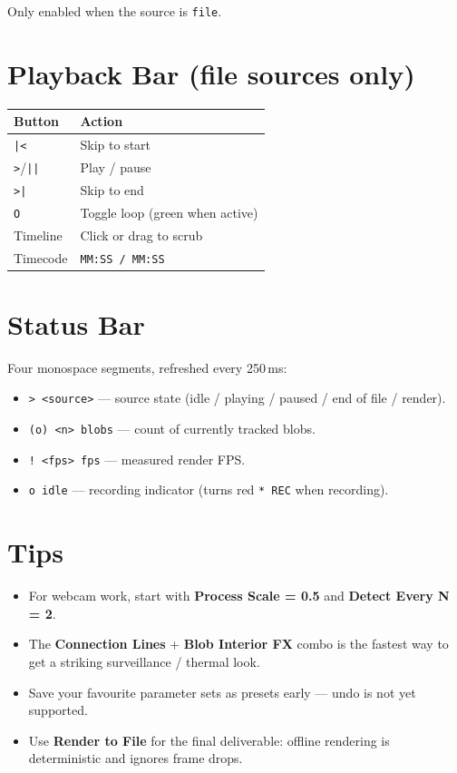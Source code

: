 \documentclass[11pt,a4paper,openany]{report}
\begin{document}
\begin{btnote}
Only enabled when the source is \texttt{file}.
\end{btnote}

\section{Playback Bar (file sources only)}

\begin{tabularx}{\linewidth}{@{}lX@{}}
    \toprule
    \textbf{Button} & \textbf{Action} \\
    \midrule
    \texttt{|<}  & Skip to start \\
    \texttt{>}/\texttt{||} & Play / pause \\
    \texttt{>|}  & Skip to end \\
    \texttt{O}   & Toggle loop (green when active) \\
    Timeline    & Click or drag to scrub \\
    Timecode    & \texttt{MM:SS / MM:SS} \\
    \bottomrule
\end{tabularx}

\section{Status Bar}

Four monospace segments, refreshed every 250\,ms:

\begin{itemize}
    \item \texttt{> <source>} --- source state (idle / playing / paused /
        end of file / render).
    \item \texttt{(o) <n> blobs} --- count of currently tracked blobs.
    \item \texttt{! <fps> fps} --- measured render FPS.
    \item \texttt{o idle} --- recording indicator (turns red \texttt{* REC}
        when recording).
\end{itemize}

\section{Tips}

\begin{itemize}
    \item For webcam work, start with \textbf{Process Scale = 0.5} and
        \textbf{Detect Every N = 2}.
    \item The \textbf{Connection Lines} + \textbf{Blob Interior FX} combo is
        the fastest way to get a striking surveillance / thermal look.
    \item Save your favourite parameter sets as presets early --- undo is
        not yet supported.
    \item Use \textbf{Render to File} for the final deliverable: offline
        rendering is deterministic and ignores frame drops.
\end{itemize}
\end{document}
